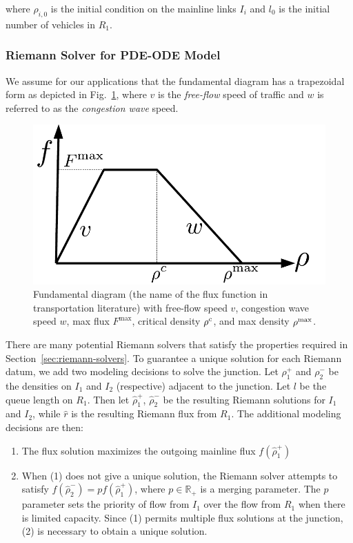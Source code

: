 where $\rho_{i,0}$ is the initial condition on the mainline links $I_i$ and $l_0$ is the initial number of vehicles in $R_1$.

\subsubsection{Riemann Solver for PDE-ODE Model}

We assume for our applications that the fundamental diagram has a trapezoidal form as depicted
in Fig.~\ref{fig:Fundamental-diagram-with}, where $v$ is the \emph{free-flow} speed of traffic and $w$ is referred to as the \emph{congestion wave} speed.

\begin{figure}
\centering
\includegraphics[width=0.4\columnwidth]{previous-articles/adjoint/figs-gen/fd}
\caption[Fundamental diagram with free-flow speed $v$, congestion wave speed $w$,
max flux $F^{\max}$, critical density $\density^{c}$, and max density
$\density^{\max}$.]{Fundamental diagram (the name of the flux function in transportation
literature) with free-flow speed $v$, congestion wave speed $w$,
max flux $F^{\max}$, critical density $\density^{c}$, and max density
$\density^{\max}$.\label{fig:Fundamental-diagram-with}}
\end{figure}

There are many potential Riemann solvers that satisfy the properties required in Section~\ref{sec:riemann-solvers}.
To guarantee a unique solution for each Riemann datum, we add two modeling decisions to solve the junction. Let $\rho_1^+$ and $\rho_2^-$ be the densities on $I_1$ and $I_2$ (respective) adjacent to the junction. Let $l$ be the queue length on $R_1$. Then let $\hat{\rho}_1^+$, $\hat{\rho}_2^-$ be the resulting Riemann solutions for $I_1$  and $I_2$, while $\hat{r}$ is the resulting Riemann flux from $R_1$. The additional modeling decisions are then:
\begin{enumerate}
\item The flux solution maximizes the outgoing mainline flux $f\left(\hat{\rho}_1^+\right)$
\item When (1) does not give a unique solution, the Riemann solver attempts to satisfy $f\left(\hat{\rho}_2^-\right)=p f\left(\hat{\rho}_1^+\right)$,
where $p\in\mathbb{R}_{+}$ is a merging parameter. The $p$ parameter sets the priority of flow from $I_1$ over the flow from $R_1$ when there is limited capacity. Since (1) permits multiple flux solutions at the junction, (2) is necessary to obtain a unique solution.
\end{enumerate}

